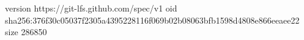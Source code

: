 version https://git-lfs.github.com/spec/v1
oid sha256:376f30c05037f2305a4395228116f069b02b08063bfb1598d4808e866eeaee22
size 286850
